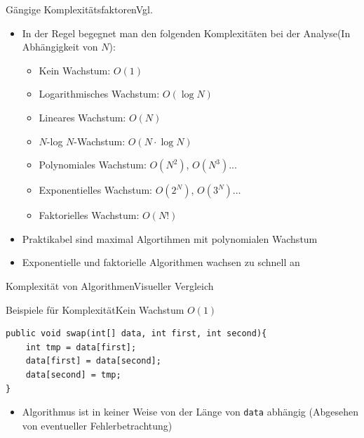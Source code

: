 \begin{frame}{Gängige Komplexitätsfaktoren}{Vgl. \cite{ottmann2017}}
    \begin{itemize}[<+->]
        \item In der Regel begegnet man den folgenden Komplexitäten bei der Analyse(In Abhängigkeit von $N$):
        \begin{itemize}
            \item Kein Wachstum: $O(1)$
            \item Logarithmisches Wachstum: $O(\log N)$
            \item Lineares Wachstum: $O(N)$
            \item $N$-log $N$-Wachstum: $O(N\cdot\log N)$
            \item Polynomiales Wachstum: $O(N^2)$, $O(N^3)$...
            \item Exponentielles Wachstum: $O(2^N)$, $O(3^N)$...
            \item Faktorielles Wachstum: $O(N!)$
        \end{itemize}
        \item Praktikabel sind maximal Algortihmen mit polynomialen Wachstum
        \item Exponentielle und faktorielle Algorithmen wachsen zu schnell an
    \end{itemize}
\end{frame}

\begin{frame}{Komplexität von Algorithmen}{Visueller Vergleich}
\begin{figure}
\centering
{}
\end{figure}
\end{frame}

\begin{frame}[fragile]{Beispiele für Komplexität}{Kein Wachstum $O(1)$}
\lstset{style=java}
\begin{lstlisting}
public void swap(int[] data, int first, int second){
    int tmp = data[first];
    data[first] = data[second];
    data[second] = tmp;
}
\end{lstlisting}
\begin{itemize}
    \item Algorithmus ist in keiner Weise von der Länge von \texttt{data} abhängig (Abgesehen von eventueller Fehlerbetrachtung)
\end{itemize}
\end{frame}

